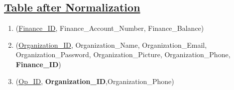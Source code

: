 \subsection*{\underline{Table after Normalization}}
\begin{enumerate}
    \item (\underline{Finance\_ID}, Finance\_Account\_Number, Finance\_Balance)
    \item (\underline{Organization\_ID}, Organization\_Name, Organization\_Email, Organization\_Password, Organization\_Picture, Organization\_Phone, \textbf{Finance\_ID})
    \item  (\underline{Op\_ID}, \textbf{Organization\_ID},{Organization\_Phone})
\end{enumerate}

\clearpage